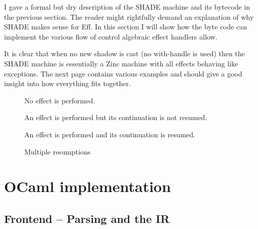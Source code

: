 \documentclass[class=article, crop=false]{standalone}
\begin{document}
I gave a formal but dry description of the SHADE machine and its bytecode in the previous section.
The reader might rightfully demand an explanation of why SHADE makes sense for Eff. In this section
I will show how the byte code can implement the various flow of control algebraic effect handlers allow.

It is clear that when no new shadow is cast (no with-handle is used) then the SHADE machine is essentially a Zinc machine with
all effects behaving like exceptions. The next page contains various examples and should give a good insight
into how everything fits together.

\begin{figure}

    \caption{No effect is performed.}
    \label{fig:shadecode-no-effect}
\end{figure}

\begin{figure}

    \caption{An effect is performed but its continuation is not resumed.}
    \label{fig:shadecode-exception}
\end{figure}


\begin{wrapfigure}{r}{0.5\textwidth}
    \begin{center}
    \end{center}
    \caption{An effect is performed and its continuation is resumed.}
    \label{fig:shadecode-one-resume}
\end{wrapfigure}
 
\begin{landscape}
    \begin{figure}
        \centering
        \caption{Multiple resumptions}
        \label{fig:shadecode-two-resume}
    \end{figure}
\end{landscape}


\section{OCaml implementation}

\subsection{Frontend -- Parsing and the IR}
\end{document}
